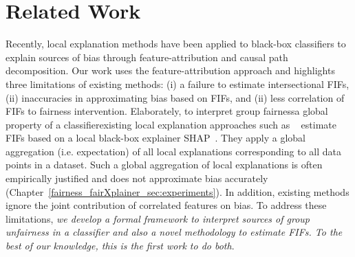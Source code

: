 \begin{example}
\end{example}



\section{Related Work}
\label{fairness_fairXplainer_sec:related_work}
Recently, local explanation methods have been applied to black-box classifiers to explain sources of bias through feature-attribution\cite{begley2020explainability,lundberg2020explaining} and causal path decomposition\cite{pan2021explaining}. Our work uses the feature-attribution approach and highlights three limitations of existing methods: (i) a failure to estimate intersectional FIFs, (ii) inaccuracies in approximating bias based on FIFs, and (ii) less correlation of FIFs to fairness intervention. Elaborately, to interpret group fairness\textemdash a global property of a classifier\textemdash existing local explanation approaches such as ~\cite{begley2020explainability,lundberg2020explaining} estimate FIFs based on a local black-box explainer SHAP~\cite{lundberg2017unified}. They apply a global aggregation (i.e. expectation) of all local explanations corresponding to all data points in a dataset. Such a global aggregation of local explanations is often empirically justified and does not approximate bias accurately (Chapter~\ref{fairness_fairXplainer_sec:experiments}).  In addition, existing methods ignore the joint contribution of correlated features on bias. To address these limitations, \textit{we develop a formal framework to interpret sources of group unfairness in a classifier and also a novel methodology to estimate FIFs. To the best of our knowledge, this is the first work to do both}.


